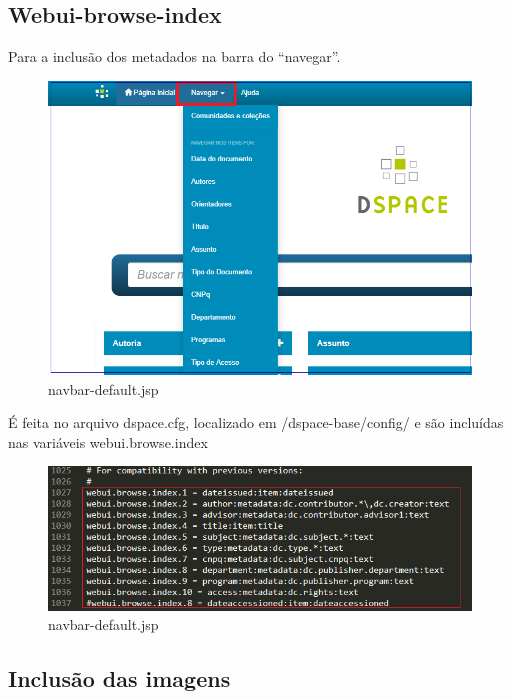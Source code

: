 \documentclass[12pt,hidelinks]{article}
\begin{document}
\newpage  

\subsection{Webui-browse-index}

Para a inclusão dos metadados na barra do “navegar”. 

    \begin{figure}[!htp]
        \centering
        \includegraphics[scale=0.5]{figura/navegar1.png}
        \caption{navbar-default.jsp}
        \label{Rotulo}
     \end{figure}



É feita no arquivo dspace.cfg, localizado em /dspace-base/config/ e são incluídas nas variáveis webui.browse.index


    \begin{figure}[!htp]
        \centering
        \includegraphics[scale=0.5]{figura/webui-browse-index.png}
        \caption{navbar-default.jsp}
        \label{Rotulo}
    \end{figure}
 
\newpage
\subsection{Inclusão das imagens}
       
\end{document}
